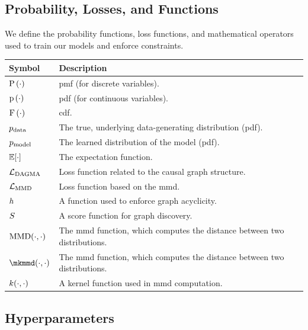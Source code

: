 \subsection{Probability, Losses, and Functions}
\label{app:nomenclature:probability_losses}

We define the probability functions, loss functions, and mathematical operators used to train our models and enforce constraints.

\begin{table}[H]
\begin{tabularx}{\textwidth}{l X}
\toprule
\textbf{Symbol} & \textbf{Description} \\
\midrule
$\operatorname{P}\left(\cdot\right)$ & \gls{pmf} (for discrete variables). \\
$\operatorname{p}\left(\cdot\right)$ & \gls{pdf} (for continuous variables). \\
$\operatorname{F}\left(\cdot\right)$ & \gls{cdf}. \\
$p_{\rm{data}}$ & The true, underlying data-generating distribution (\gls{pdf}). \\
$p_{\rm{model}}$ & The learned distribution of the model (\gls{pdf}). \\
$\mathbb{E}[\cdot]$ & The expectation function. \\
$\mathcal{L}_{\text{DAGMA}}$ & Loss function related to the causal graph structure. \\
$\mathcal{L}_{\text{MMD}}$ & Loss function based on the \gls{mmd}. \\
$h$ & A function used to enforce graph acyclicity. \\
$S$ & A score function for graph discovery. \\
$\operatorname{MMD}(\cdot, \cdot)$ & The \gls{mmd} function, which computes the distance between two distributions. \\
$\mkmmd(\cdot, \cdot)$ & The \gls{mmd} function, which computes the distance between two distributions. \\
$k(\cdot, \cdot)$ & A kernel function used in \gls{mmd} computation. \\
\bottomrule
\end{tabularx}
\end{table}

\subsection{Hyperparameters}
\label{app:nomenclature:hyperparams}

